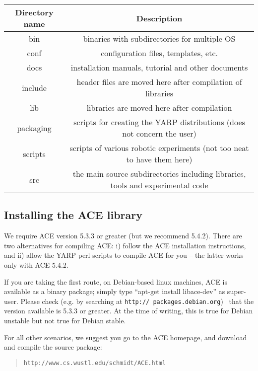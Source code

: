 \begin{table}[h]
	\centering
		\begin{tabular}{|c|c|}
		\hline
			Directory name & Description \\
			\hline \hline
			bin & binaries with subdirectories for multiple OS \\
			\hline
			conf & configuration files, templates, etc. \\
			\hline
			docs & installation manuals, tutorial and other documents \\
			\hline
			include & header files are moved here after compilation of libraries \\
			\hline
			lib & libraries are moved here after compilation \\
			\hline
			packaging & scripts for creating the YARP distributions (does not concern the user) \\
			\hline
			scripts & scripts of various robotic experiments (not too neat to have them here) \\
			\hline
			src & the main source subdirectories including libraries, tools and experimental code \\
			\hline
		\end{tabular}
\end{table}


\subsection{Installing the ACE library}
\label{sect:ace}

We require ACE version 5.3.3 or greater (but we recommend 5.4.2). There are two alternatives for compiling ACE: i) follow the ACE installation instructions, and ii) allow the YARP perl scripts to compile ACE for you -- the latter works only with ACE 5.4.2.

If you are taking the first route, on Debian-based linux machines, ACE is available as a binary package; simply type ``apt-get install libace-dev'' as super-user.  Please
check (e.g. by searching at {\tt http:// packages.debian.org}) ~that the version available is 5.3.3 or greater.  At the time of writing, this is true for Debian unstable but not true for Debian stable.

For all other scenarios, we suggest you go to the ACE homepage, and
download and compile the source package:

\begin{quote}
{\tt http://www.cs.wustl.edu/schmidt/ACE.html}
\end{quote}

